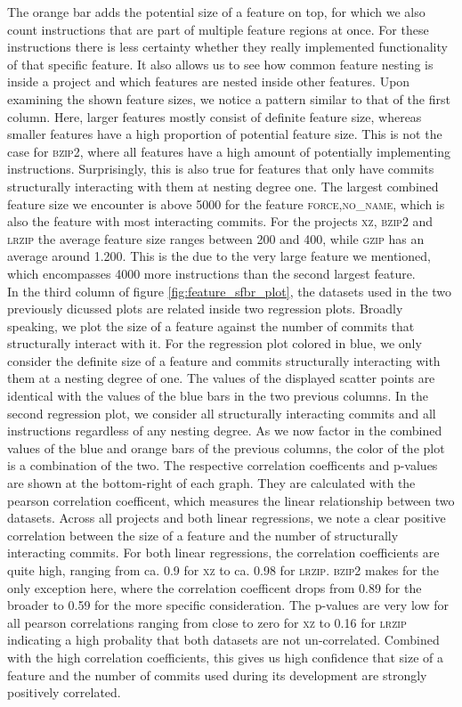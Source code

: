The orange bar adds the potential size of a feature on top, for which we also count instructions that are part of multiple feature regions at once.
For these instructions there is less certainty whether they really implemented functionality of that specific feature.
It also allows us to see how common feature nesting is inside a project and which features are nested inside other features.
Upon examining the shown feature sizes, we notice a pattern similar to that of the first column.
Here, larger features mostly consist of definite feature size, whereas smaller features have a high proportion of potential feature size.
This is not the case for \textsc{bzip2}, where all features have a high amount of potentially implementing instructions.
Surprisingly, this is also true for features that only have commits structurally interacting with them at nesting degree one.
The largest combined feature size we encounter is above 5000 for the feature \textsc{force,no\_name}, which is also the feature with most interacting commits.
For the projects \textsc{xz}, \textsc{bzip2} and \textsc{lrzip} the average feature size ranges between 200 and 400, while \textsc{gzip} has an average around 1.200.
This is the due to the very large feature we mentioned, which encompasses 4000 more instructions than the second largest feature. \\
In the third column of figure \ref{fig:feature_sfbr_plot}, the datasets used in the two previously dicussed plots are related inside two regression plots.
Broadly speaking, we plot the size of a feature against the number of commits that structurally interact with it.
For the regression plot colored in blue, we only consider the definite size of a feature and commits structurally interacting with them at a nesting degree of one.
The values of the displayed scatter points are identical with the values of the blue bars in the two previous columns. 
In the second regression plot, we consider all structurally interacting commits and all instructions regardless of any nesting degree.
As we now factor in the combined values of the blue and orange bars of the previous columns, the color of the plot is a combination of the two.
The respective correlation coefficents and p-values are shown at the bottom-right of each graph.
They are calculated with the pearson correlation coefficent, which measures the linear relationship between two datasets.
Across all projects and both linear regressions, we note a clear positive correlation between the size of a feature and the number of structurally interacting commits.
For both linear regressions, the correlation coefficients are quite high, ranging from ca. 0.9 for \textsc{xz} to ca. 0.98 for \textsc{lrzip}.
\textsc{bzip2} makes for the only exception here, where the correlation coefficent drops from 0.89 for the broader to 0.59 for the more specific consideration.
The p-values are very low for all pearson correlations ranging from close to zero for \textsc{xz} to 0.16 for \textsc{lrzip} indicating a high probality that both datasets are not un-correlated.
Combined with the high correlation coefficients, this gives us high confidence that size of a feature and the number of commits used during its development are strongly positively correlated.

